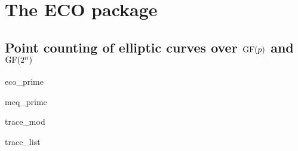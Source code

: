 %
%
%
%

\part*{The \LiDIA ECO package}\label{LiDIA-ECO}


\chapter{Point counting of elliptic curves over $\mathrm{GF}(p)$ and $\mathrm{GF}(2^n)$}

\begin{class}{eco_prime}
  
\end{class}

\begin{class}{meq_prime}
  
\end{class}

\begin{class}{trace_mod}
  
\end{class}

\begin{class}{trace_list}
  
\end{class}
